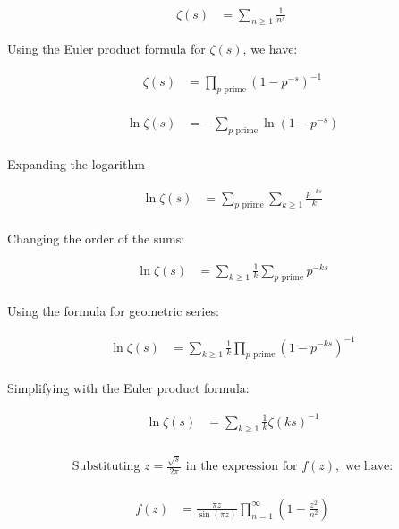 \documentclass{article}
\begin{document}
\begin{align*}
\zeta(s) &= \sum_{n\geq 1} \frac{1}{n^s} \
\end{align*}

Using the Euler product formula for $\zeta(s)$, we have:

\begin{align*}
\zeta(s) &= \prod_{p \text{ prime}} \left(1 - p^{-s}\right)^{-1} \\
\end{align*}

\begin{align*}
\ln \zeta(s) &= -\sum_{p \text{ prime}} \ln(1-p^{-s}) \\
\end{align*}

Expanding the logarithm

\begin{align*}
\ln \zeta(s) &= \sum_{p \text{ prime}} \sum_{k \geq 1} \frac{p^{-ks}}{k} \\
\end{align*}

Changing the order of the sums:

\begin{align*}
\ln \zeta(s) &= \sum_{k \geq 1} \frac{1}{k} \sum_{p \text{ prime}} p^{-ks} \\
\end{align*}

Using the formula for geometric series:

\begin{align*}
\ln \zeta(s) &= \sum_{k \geq 1} \frac{1}{k} \prod_{p \text{ prime}} (1-p^{-ks})^{-1} \\
\end{align*}

Simplifying with the Euler product formula:

\begin{align*}
\ln \zeta(s) &= \sum_{k \geq 1} \frac{1}{k} \zeta(ks)^{-1} \\
\end{align*}

\begin{align*}
\text{Substituting } z = \frac{\sqrt{s}}{2\pi} \text{ in the expression for } f(z), \text{ we have:} \\
\end{align*}

\begin{align*}
f(z) &= \frac{\pi z}{\sin(\pi z)} \prod_{n=1}^{\infty} \left(1 - \frac{z^2}{n^2}\right) \\
\end{align*}
\end{document}
